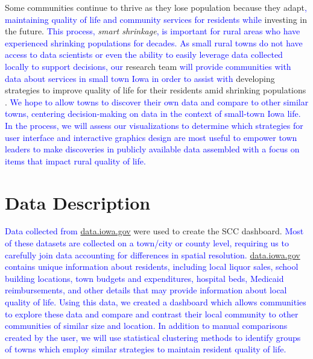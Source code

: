 \documentclass[10pt]{article}\usepackage[]{graphicx}\usepackage[]{color}
\newcommand{\svp}[1]{{\textcolor{blue}{#1}}}
\begin{document}
Some communities continue to thrive as they lose population because they adapt\svp{, maintaining quality of life and community services for residents while} investing in the future. %
\svp{This process,} \emph{smart shrinkage}\svp{, is important for rural areas who have experienced shrinking populations for decades.} 
\svp{As small rural towns do not have access to data scientists or even the ability to easily leverage data collected locally to support decisions, our} research team \svp{will provide communities with data about services in small town Iowa in order to assist with} developing strategies to improve quality of life for their residents amid shrinking populations \cite{scc}. \svp{We hope to allow towns to discover their own data and compare to other similar towns, centering decision-making on data in the context of small-town Iowa life. In the process, we will assess our visualizations to determine which strategies for user interface and interactive graphics design are most useful to empower town leaders to make discoveries in publicly available data assembled with a focus on items that impact rural quality of life.}

\section{Data Description}
\svp{Data collected from \url{data.iowa.gov}} were used to create the SCC dashboard. \svp{Most of these datasets are collected on a town/city or county level, requiring us to carefully join data accounting for differences in spatial resolution.} \svp{\url{data.iowa.gov} contains unique information about residents, including local liquor sales, school building locations, town budgets and expenditures, hospital beds, Medicaid reimbursements, and other details that may provide information about local quality of life.} 
\svp{Using this data, we created a dashboard which allows communities to explore these data and compare and contrast their local community to other communities of similar size and location. In addition to manual comparisons created by the user, we will use statistical clustering methods to identify groups of towns which employ similar strategies to maintain resident quality of life.}
\end{document}
